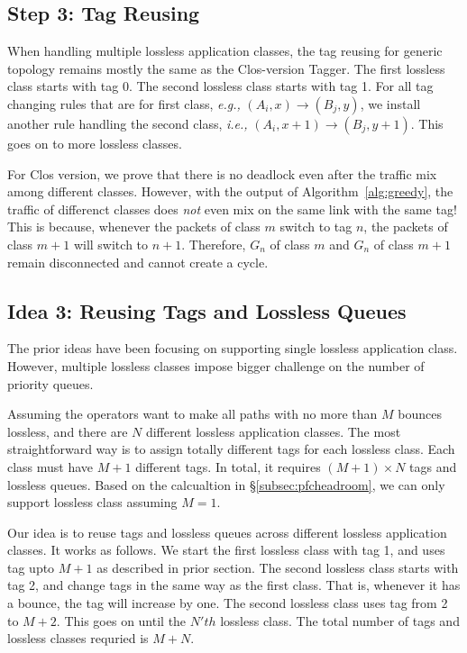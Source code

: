 \subsection{Step 3: Tag Reusing}

When handling multiple lossless application classes, the tag reusing for generic topology 
remains mostly the same as the Clos-version Tagger.
The first lossless class starts with tag 0. The second lossless class starts with 
tag 1. For all tag changing rules that are for first class, {\em e.g.,} 
$(A_i, x)\rightarrow(B_j, y)$, we install another rule handling the second class,
{\em i.e.,} $(A_i, x+1)\rightarrow(B_j, y+1)$. This goes on to more lossless classes.

For Clos version, we prove that there is no deadlock even after the traffic mix among
different classes. However, with the output of Algorithm~\ref{alg:greedy}, the traffic
of differenct classes does {\em not} even mix on the same link with the same tag!
This is because, whenever the packets of class $m$ switch to tag $n$,  the packets of
class $m+1$ will switch to $n+1$. Therefore, $G_n$ of class $m$ and $G_n$ of class $m+1$
remain disconnected and cannot create a cycle.



\subsection{Idea 3: Reusing Tags and Lossless Queues}\label{subsec:reusing}

The prior ideas have been focusing on supporting single lossless application class. 
However, multiple lossless classes impose bigger challenge on the number of priority queues.

Assuming the operators want to make all paths with no more than $M$ bounces lossless, 
and there are $N$ different lossless application classes. The most straightforward
way is to assign totally different tags for each lossless class. Each class must have 
$M+1$ different tags. In total, it requires $(M+1) \times N$ tags and lossless queues.
Based on the calcualtion in \S\ref{subsec:pfcheadroom}, we can only support 
lossless class assuming $M=1$.

Our idea is to reuse tags and lossless queues across different lossless application classes.
It works as follows. We start the first lossless class with tag 1, and uses tag upto $M+1$
as described in prior section.
The second lossless class starts with tag 2, and change tags in the same way as the first class.
That is, whenever it has a bounce, the tag will increase by one. The second lossless class
uses tag from 2 to $M+2$. This goes on until the $N'th$ lossless class. The total number of tags
and lossless classes requried is $M + N$.

